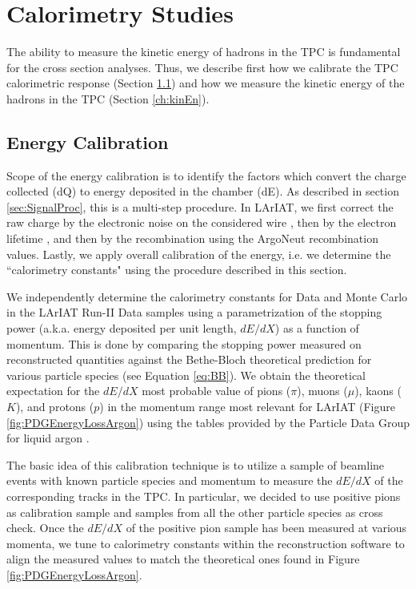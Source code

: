 \clearpage

\section{Calorimetry Studies}\label{ch:energyCal} 
The ability to measure the kinetic energy of hadrons in the TPC is fundamental for the cross section analyses. 
Thus, we describe first how we calibrate the TPC calorimetric response (Section \ref{ch:energyCalibration}) and how we measure the kinetic energy of the hadrons in the TPC (Section \ref{ch:kinEn}).

\subsection{Energy Calibration}\label{ch:energyCalibration}
Scope of the energy calibration is to identify the factors which convert the charge collected (dQ) to energy deposited in the chamber (dE). As described in section \ref{sec:SignalProc}, this is a multi-step procedure. In LArIAT, we first correct the raw charge by the electronic noise on the considered wire \cite{LArIATdqdx}, then by the electron lifetime \cite{LArIATLifeTime},  and then by the recombination using the ArgoNeut recombination values. Lastly, we apply overall calibration of the energy, i.e. we determine the ``calorimetry constants" using the procedure described in this section.


We independently determine  the calorimetry constants for Data and Monte Carlo in the LArIAT Run-II Data samples using  a parametrization of the stopping power (a.k.a. energy deposited per unit length, $dE/dX$)  as a function of momentum. This is done by comparing the stopping power measured on reconstructed quantities against the Bethe-Bloch theoretical prediction for various particle species (see Equation \ref{eq:BB}).  We obtain the theoretical expectation for the $dE/dX$ most probable value of pions ($\pi$), muons ($\mu$), kaons ($K$), and protons ($p$) in the momentum range most relevant for LArIAT (Figure \ref{fig:PDGEnergyLossArgon}) using the tables provided by the Particle Data Group \cite{Patrignani:2016xqp} for liquid argon \cite{PDG-Argon}.

The basic idea of this calibration technique is to utilize a sample of beamline events with known particle species and momentum to measure the $dE/dX$ of the corresponding tracks in the TPC. In particular, we decided to use positive pions as calibration sample and samples from all the other particle species as cross check. Once the $dE/dX$ of the positive pion sample  has been measured at various momenta, we tune to calorimetry constants within the reconstruction software to align the measured values to match the theoretical ones found in Figure \ref{fig:PDGEnergyLossArgon}. 

